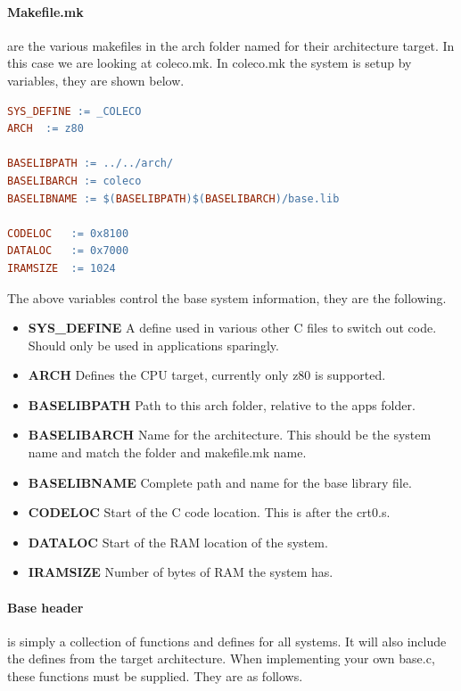 \documentclass{article}
\begin{document}
  \paragraph{Makefile.mk} are the various makefiles in the arch folder named for their architecture target. In this case we are looking at coleco.mk.
  In coleco.mk the system is setup by variables, they are shown below.

    \begin{lstlisting}[language=make]
SYS_DEFINE := _COLECO
ARCH  := z80

BASELIBPATH := ../../arch/
BASELIBARCH := coleco
BASELIBNAME := $(BASELIBPATH)$(BASELIBARCH)/base.lib

CODELOC   := 0x8100
DATALOC   := 0x7000
IRAMSIZE  := 1024
  \end{lstlisting}

  The above variables control the base system information, they are the following.

  \begin{itemize}
    \item \textbf{SYS\_DEFINE} A define used in various other C files to switch out code. Should only be used in applications sparingly.
    \item \textbf{ARCH} Defines the CPU target, currently only z80 is supported.
    \item \textbf{BASELIBPATH} Path to this arch folder, relative to the apps folder.
    \item \textbf{BASELIBARCH} Name for the architecture. This should be the system name and match the folder and makefile.mk name.
    \item \textbf{BASELIBNAME} Complete path and name for the base library file.
    \item \textbf{CODELOC} Start of the C code location. This is after the crt0.s.
    \item \textbf{DATALOC} Start of the RAM location of the system.
    \item \textbf{IRAMSIZE} Number of bytes of RAM the system has.
  \end{itemize}

  \paragraph{Base header} is simply a collection of functions and defines for all systems. It will also include the defines from the target architecture.
  When implementing your own base.c, these functions must be supplied. They are as follows.
\end{document}
